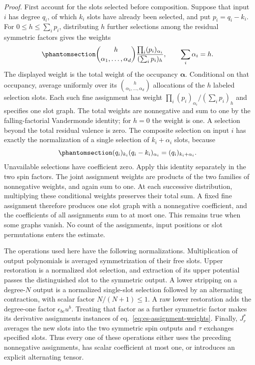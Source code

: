 \documentclass[
  english,
  11pt,
  reqno]{amsart}
\begin{document}
\emph{Proof.} First account for the slots selected before composition.
Suppose that input \(i\) has degree \(q_i\), of which \(k_i\) slots have
already been selected, and put \(p_i=q_i-k_i\). For
\(0\le h\le\sum_i p_i\), distributing \(h\) further selections among the
residual symmetric factors gives the weights
\begin{equation}\protect\phantomsection\label{eq:es-assignment-weights}{
 \binom h{\alpha_1,\ldots,\alpha_d}
 \frac{\prod_i(p_i)_{\alpha_i}}{(\sum_i p_i)_h},
 \qquad \sum_i\alpha_i=h.
}\end{equation} The displayed weight is the total weight of the
occupancy \(\boldsymbol\alpha\). Conditional on that occupancy, average
uniformly over its \(\binom h{\alpha_1,\ldots,\alpha_d}\) allocations of
the \(h\) labeled selection slots. Each such fine assignment has weight
\(\prod_i(p_i)_{\alpha_i}/(\sum_i p_i)_h\) and specifies one slot graph.
The total weights are nonnegative and sum to one by the
falling-factorial Vandermonde identity; for \(h=0\) the weight is one. A
selection beyond the total residual valence is zero. The composite
selection on input \(i\) has exactly the normalization of a single
selection of \(k_i+\alpha_i\) slots, because
\begin{equation}\protect\phantomsection\label{eq:es-preselected-normalization}{
 (q_i)_{k_i}(q_i-k_i)_{\alpha_i}=(q_i)_{k_i+\alpha_i}.
}\end{equation} Unavailable selections have coefficient zero. Apply this
identity separately in the two spin factors. The joint assignment
weights are products of the two families of nonnegative weights, and
again sum to one. At each successive distribution, multiplying these
conditional weights preserves their total sum. A fixed fine assignment
therefore produces one slot graph with a nonnegative coefficient, and
the coefficients of all assignments sum to at most one. This remains
true when some graphs vanish. No count of the assignments, input
positions or slot permutations enters the estimate.

The operations used here have the following normalizations.
Multiplication of output polynomials is averaged symmetrization of their
free slots. Upper restoration is a normalized slot selection, and
extraction of its upper potential passes the distinguished slot to the
symmetric output. A lower stripping on a degree-\(N\) output is a
normalized single-slot selection followed by an alternating contraction,
with scalar factor \(N/(N+1)\le1\). A raw lower restoration adds the
degree-one factor \(\epsilon_{bc}u^b\). Treating that factor as a
further symmetric factor makes its derivative assignments instances of
eq.~\ref{eq:es-assignment-weights}. Finally, \(J_r^*\) averages the new
slots into the two symmetric spin outputs and \(\tau\) exchanges
specified slots. Thus every one of these operations either uses the
preceding nonnegative assignments, has scalar coefficient at most one,
or introduces an explicit alternating tensor.
\end{document}
